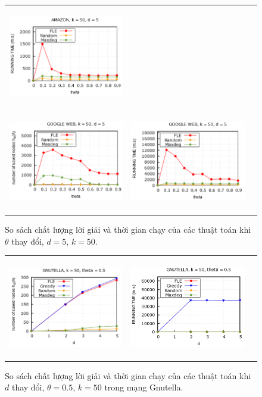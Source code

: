 \begin{figure}[H]
\begin{tabular}{lll}
		\includegraphics[height = 4.4cm]{picture/FLE/amazon_time_theta} 
		\\
		\includegraphics[height = 4.4cm]{picture/FLE/google_res_theta} &
		\includegraphics[height = 4.4cm]{picture/FLE/google_time_theta} 
	\end{tabular}
	\caption{So sách chất lượng lời giải và thời gian chạy của các thuật toán khi $\theta$ thay đổi, $d=5$, $k=50$.} 
	\label{fig:FLE_theta}   
\end{figure} 

\begin{figure}[H]
	\begin{tabular}{lll}
		\includegraphics[height = 4.4cm]{picture/FLE/gnu_res_d} &
		\includegraphics[height = 4.4cm]{picture/FLE/gnu_time_d}
	\end{tabular}
	\caption{So sách chất lượng lời giải và thời gian chạy của các thuật toán khi $d$ thay đổi, $\theta=0.5$, $k=50$ trong mạng Gnutella.} 
	\label{fig:FLE_d}   
\end{figure} 

